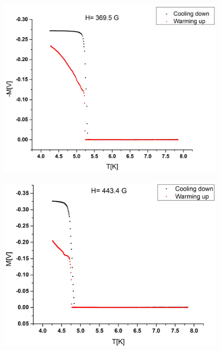 \documentclass[openany,11pt,a4paper]{report}
\begin{document}
\begin{figure}[H]
\begin{center}
\includegraphics[scale=0.35]{finalfive.jpg} 
\end{center}
\end{figure}


\begin{figure}[H]
\begin{center}
\includegraphics[scale=0.35]{finalsix.jpg}
\end{center}
\end{figure}
\end{document}
